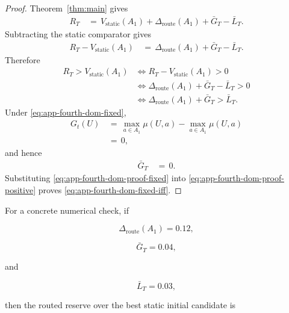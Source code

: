 \documentclass{article} %
\begin{document}
\begin{proof}
Theorem~\ref{thm:main} gives
\begin{align}
\label{eq:app-fourth-dom-proof-main}
R_T
&\,=\,
V_{\mathrm{static}}(A_1)
+
\Delta_{\mathrm{route}}(A_1)
+
\bar G_T
-
\bar L_T.
\end{align}
Subtracting the static comparator gives
\begin{align}
\label{eq:app-fourth-dom-proof-subtract}
R_T
-
V_{\mathrm{static}}(A_1)
&\,=\,
\Delta_{\mathrm{route}}(A_1)
+
\bar G_T
-
\bar L_T.
\end{align}
Therefore
\begin{align}
\label{eq:app-fourth-dom-proof-positive}
R_T
>
V_{\mathrm{static}}(A_1)
&\Longleftrightarrow
R_T
-
V_{\mathrm{static}}(A_1)
>
0
\\
&\Longleftrightarrow
\Delta_{\mathrm{route}}(A_1)
+
\bar G_T
-
\bar L_T
>
0
\\
&\Longleftrightarrow
\Delta_{\mathrm{route}}(A_1)
+
\bar G_T
>
\bar L_T.
\end{align}
Under \eqref{eq:app-fourth-dom-fixed},
\begin{align}
\label{eq:app-fourth-dom-proof-gzero}
G_t(U)
&\,=\,
\max_{a\in A_1}\mu(U,a)
-
\max_{a\in A_1}\mu(U,a)
\\
&\,=\,
0,
\end{align}
and hence
\begin{align}
\label{eq:app-fourth-dom-proof-fixed}
\bar G_T
&\,=\,
0.
\end{align}
Substituting \eqref{eq:app-fourth-dom-proof-fixed} into \eqref{eq:app-fourth-dom-proof-positive} proves \eqref{eq:app-fourth-dom-fixed-iff}.
\end{proof}

For a concrete numerical check, if

\begin{equation}
\label{eq:app-fourth-dom-example-delta}
\Delta_{\mathrm{route}}(A_1)=0.12,
\end{equation}

\begin{equation}
\label{eq:app-fourth-dom-example-g}
\bar G_T=0.04,
\end{equation}

and

\begin{equation}
\label{eq:app-fourth-dom-example-l}
\bar L_T=0.03,
\end{equation}

then the routed reserve over the best static initial candidate is
\end{document}
